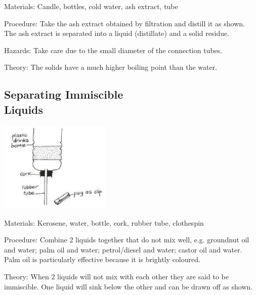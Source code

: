 \begin{multicols}{2}
\begin{description*}
\item[Materials:]{Candle, bottles, cold water, ash extract, tube}
\item[Procedure:]{Take the ash extract obtained by filtration and distill it as shown. The
ash extract is separated into a liquid (distillate)
and a solid residue.}
\item[Hazards:]{Take care due to the small diameter of the
connection tubes.}
\item[Theory:]{The solids have a much higher boiling point
than the water.}
\end{description*}

\subsection[Separating Immiscible Liquids]{Separating Immiscible \hfill \\ Liquids} %

\begin{center}
\includegraphics[width=0.4\textwidth]{./img/vso/sep-immiscible.jpg}
\end{center}

\begin{description*}
\item[Materials:]{Kerosene, water, bottle, cork, rubber tube, clothespin}
\item[Procedure:]{Combine 2 liquids together that do not mix well, e.g. groundnut oil and water; palm oil
and water; petrol/diesel and
water; castor oil and water. Palm
oil is particularly effective because
it is brightly coloured.}
\item[Theory:]{When 2 liquids will not mix with
each other they are said to be
immiscible. One liquid will sink
below the other and can be
drawn off as shown.}
\end{description*}


\end{multicols}
